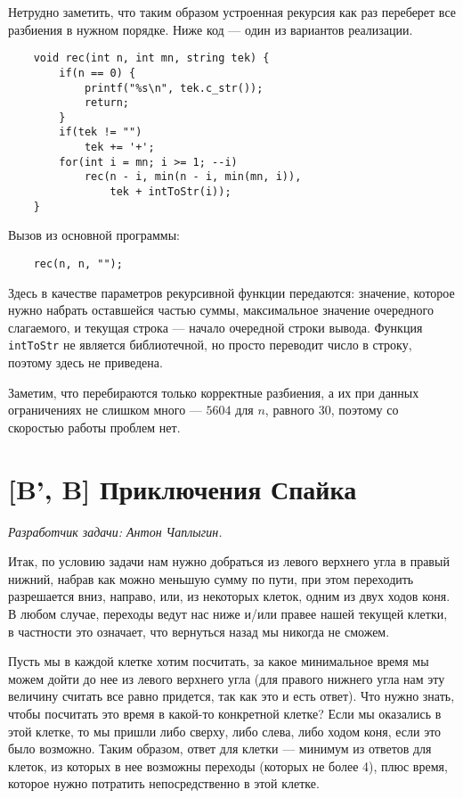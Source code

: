 \documentclass[12pt]{article}
\theoremstyle{definition}
\begin{document}
Нетрудно заметить, что таким образом устроенная рекурсия как
раз переберет все разбиения в нужном порядке. Ниже код ---
один из вариантов реализации.
\begin{lstlisting}
    void rec(int n, int mn, string tek) {
        if(n == 0) {
            printf("%s\n", tek.c_str());
            return;
        }
        if(tek != "")
            tek += '+';
        for(int i = mn; i >= 1; --i)
            rec(n - i, min(n - i, min(mn, i)),
                tek + intToStr(i));
    }
\end{lstlisting}
Вызов из основной программы:
\begin{lstlisting}
    rec(n, n, "");
\end{lstlisting}
Здесь в качестве параметров рекурсивной функции передаются:
значение, которое нужно набрать оставшейся частью суммы,
максимальное значение очередного слагаемого, и текущая строка ---
начало очередной строки вывода. Функция \verb|intToStr|
не является библиотечной, но просто переводит число в строку, поэтому здесь не приведена.

Заметим, что перебираются только корректные разбиения,
а их при данных ограничениях не слишком много ---
$5604$ для $n$, равного $30$, поэтому со скоростью работы проблем нет.

\section{[B', B] Приключения Спайка}
\textit{Разработчик задачи: Антон Чаплыгин.}

Итак, по условию задачи нам нужно добраться из левого верхнего угла в правый нижний, набрав как можно меньшую сумму по пути,
при этом переходить разрешается вниз, направо, или, из некоторых клеток, одним из двух ходов коня. В любом случае, переходы
ведут нас ниже и/или правее нашей текущей клетки, в частности это означает, что вернуться назад мы никогда не сможем.

Пусть мы в каждой клетке хотим посчитать, за какое
минимальное время мы можем дойти до нее из левого верхнего угла (для правого нижнего угла нам эту величину считать все равно
придется, так как это и есть ответ). Что нужно знать, чтобы
посчитать это время в какой-то конкретной клетке?
Если мы оказались в этой клетке, то мы пришли либо сверху, либо слева, либо ходом коня, если это было возможно. Таким образом, ответ для клетки --- минимум из ответов для клеток, из которых в нее возможны переходы (которых не более 4), плюс время, которое нужно потратить непосредственно в этой клетке.
\end{document}
